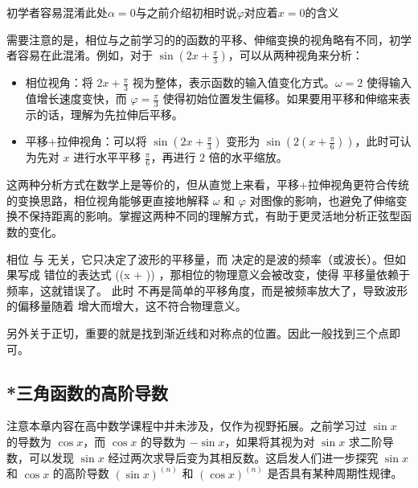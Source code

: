 初学者容易混淆此处$\alpha=0$与之前介绍初相时说$\varphi$对应着$x=0$的含义


需要注意的是，相位与之前学习的的函数的平移、伸缩变换的视角略有不同，初学者容易在此混淆。例如，对于 $\displaystyle\sin(2x + \frac{\pi}{3})$，可以从两种视角来分析：
\begin{itemize}
\item 相位视角：将 $\displaystyle2x + \frac{\pi}{3}$ 视为整体，表示函数的输入值变化方式。$\omega = 2$ 使得输入值增长速度变快，而 $\displaystyle\varphi = \frac{\pi}{3}$ 使得初始位置发生偏移。如果要用平移和伸缩来表示的话，理解为先拉伸后平移。
\item 平移+拉伸视角：可以将 $\displaystyle\sin(2x + \frac{\pi}{3})$ 变形为 $\displaystyle\sin\left(2(x + \frac{\pi}{6})\right)$，此时可认为先对 $x$ 进行水平平移 $\displaystyle\frac{\pi}{6}$，再进行 $2$ 倍的水平缩放。
\end{itemize}

这两种分析方式在数学上是等价的，但从直觉上来看，平移+拉伸视角更符合传统的变换思路，相位视角能够更直接地解释 $\omega$ 和 $\varphi$ 对图像的影响，也避免了伸缩变换不保持距离的影响。掌握这两种不同的理解方式，有助于更灵活地分析正弦型函数的变化。

相位  \phi  与  \omega  无关，它只决定了波形的平移量，而  \omega  决定的是波的频率（或波长）。但如果写成 错位的表达式  \sin(\omega(x + \phi)) ，那相位的物理意义会被改变，使得 平移量依赖于频率，这就错误了。
此时  \phi  不再是简单的平移角度，而是被频率放大了，导致波形的偏移量随着  \omega  增大而增大，这不符合物理意义。

另外关于正切，重要的就是找到渐近线和对称点的位置。因此一般找到三个点即可。

\subsection{*三角函数的高阶导数}


注意本章内容在高中数学课程中并未涉及，仅作为视野拓展。之前学习过 $\sin x$ 的导数为 $\cos x$，而 $\cos x$ 的导数为 $-\sin x$，如果将其视为对 $\sin x$ 求二阶导数，可以发现 $\sin x$ 经过两次求导后变为其相反数。这启发人们进一步探究 $\sin x$ 和 $\cos x$ 的高阶导数 $(\sin x)^{(n)}$ 和 $(\cos x)^{(n)}$ 是否具有某种周期性规律。

